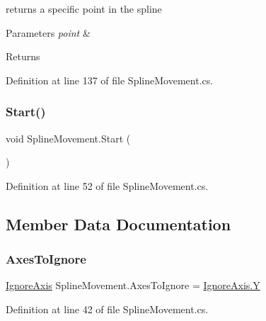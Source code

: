 returns a specific point in the spline 


\begin{DoxyParams}{Parameters}
{\em point} & \\
\hline
\end{DoxyParams}
\begin{DoxyReturn}{Returns}

\end{DoxyReturn}


Definition at line 137 of file Spline\+Movement.\+cs.

\mbox{\label{class_spline_movement_a55ac2dde40f8639ff040dd07fb63b34e}} 
\subsubsection{\texorpdfstring{Start()}{Start()}}
{\footnotesize\ttfamily void Spline\+Movement.\+Start (\begin{DoxyParamCaption}{ }\end{DoxyParamCaption})}



Definition at line 52 of file Spline\+Movement.\+cs.



\subsection{Member Data Documentation}
\mbox{\label{class_spline_movement_a5731a01361661e4c1cc4de230e3d80be}} 
\subsubsection{\texorpdfstring{Axes\+To\+Ignore}{AxesToIgnore}}
{\footnotesize\ttfamily \mbox{\hyperlink{_ignore_axis_8cs_aa61b0141055d583a4f5b013297a1d48f}{Ignore\+Axis}} Spline\+Movement.\+Axes\+To\+Ignore = \mbox{\hyperlink{_ignore_axis_8cs_aa61b0141055d583a4f5b013297a1d48fa57cec4137b614c87cb4e24a3d003a3e0}{Ignore\+Axis.\+Y}}}



Definition at line 42 of file Spline\+Movement.\+cs.

